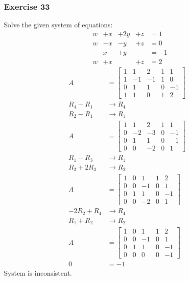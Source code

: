 \documentclass{math}
\begin{document}
\subsubsection*{Exercise 33}
Solve the given system of equations:
\[ \begin{alignedat}{5}
  &w &+x &+2y &+z &= 1 \\
  &w &-x &-y  &+z &= 0 \\
  &  &x  &+y  &   &= -1 \\
  &w &+x &    &+z &= 2
\end{alignedat} \]
\begin{align*}
  A &= \begin{bmatrix}
    1 & 1 & 2 & 1 & 1 \\
    1 & -1 & -1 & 1 & 0 \\
    0 & 1 & 1 & 0 & -1 \\
    1 & 1 & 0 & 1 & 2
  \end{bmatrix} \\
  R_4-R_1 &\to R_4 \\
  R_2-R_1 &\to R_1 \\
  A &= \begin{bmatrix}
    1 & 1 & 2 & 1 & 1 \\
    0 & -2 & -3 & 0 & -1 \\
    0 & 1 & 1 & 0 & -1 \\
    0 & 0 & -2 & 0 & 1
  \end{bmatrix} \\
  R_1-R_3 &\to R_1 \\
  R_2+2R_3 &\to R_2 \\
  A &= \begin{bmatrix}
    1 & 0 & 1 & 1 & 2 \\
    0 & 0 & -1 & 0 & 1 \\
    0 & 1 & 1 & 0 & -1 \\
    0 & 0 & -2 & 0 & 1
  \end{bmatrix} \\
  -2R_2+R_4 &\to R_4 \\
  R_1+R_2 &\to R_2 \\
  A &= \begin{bmatrix}
    1 & 0 & 1 & 1 & 2 \\
    0 & 0 & -1 & 0 & 1 \\
    0 & 1 & 1 & 0 & -1 \\
    0 & 0 & 0 & 0 & -1
  \end{bmatrix} \\
  0 &= -1
\end{align*}
System is inconsistent.
\end{document}
